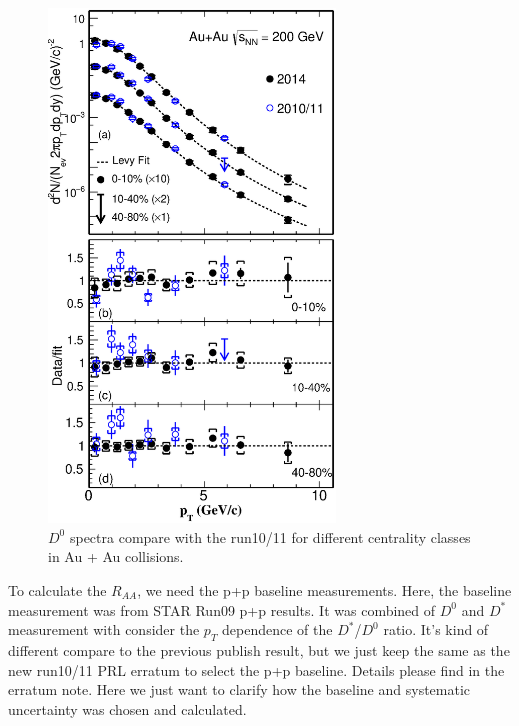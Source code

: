 \begin{figure}
\centering
\includegraphics[width=0.68\textwidth]{figure/Run14_D0HFT/D0_compareSpectra_run10.eps}
\caption{$D^{0}$ spectra compare with the run10/11 for different centrality classes in Au + Au collisions.}
\label{D0_compareSpectra_run10} 
\end{figure}

To calculate the $R_{AA}$, we need the p+p baseline measurements. Here, the baseline measurement was from STAR Run09 p+p results. It was combined of $D^0$ and $D^{*}$ measurement with consider the $p_T$ dependence of the $D^*$/$D^0$ ratio. It's kind of different compare to the previous publish result, but we just keep the same as the new run10/11 PRL erratum to select the p+p baseline. Details please find in the erratum note. Here we just want to clarify how the baseline and systematic uncertainty was chosen and calculated.

